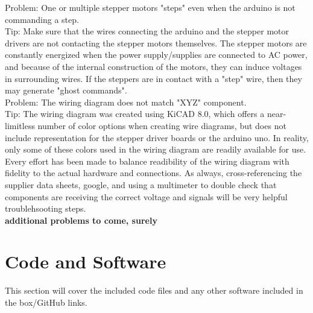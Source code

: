 \documentclass{article}
\begin{document}
Problem: One or multiple stepper motors "steps" even when the arduino is not commanding a step. \\
Tip: Make sure that the wires connecting the arduino and the stepper motor drivers are not contacting the stepper motors themselves. The stepper motors are constantly energized when the power supply/supplies are connected to AC power, and because of the internal construction of the motors, they can induce voltages in surrounding wires. If the steppers are in contact with a "step" wire, then they may generate "ghost commands".\\

Problem: The wiring diagram does not match "XYZ" component. \\
Tip: The wiring diagram was created using KiCAD 8.0, which offers a near-limitless number of color options when creating wire diagrams, but does not include representation for the stepper driver boards or the arduino uno. In reality, only some of these colors used in the wiring diagram are readily available for use. Every effort has been made to balance readibility of the wiring diagram with fidelity to the actual hardware and connections.  As always, cross-referencing the supplier data sheets, google, and using a multimeter to double check that components are receiving the correct voltage and signals will be very helpful troublehsooting steps.\\

\textbf{additional problems to come, surely}

\section{Code and Software}
This section will cover the included code files and any other software included in the box/GitHub links.
\end{document}
